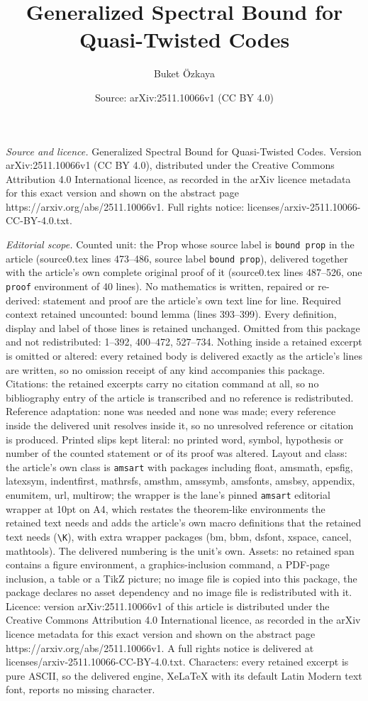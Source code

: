 \documentclass[10pt,a4paper]{amsart}
\title[Generalized Spectral Bound for Quasi-Twisted Codes]{Generalized Spectral Bound for Quasi-Twisted Codes}
\author{Buket \"Ozkaya}
\date{Source: arXiv:2511.10066v1 (CC BY 4.0)}
\begin{document}
\maketitle

\noindent\emph{Source and licence.} Generalized Spectral Bound for Quasi-Twisted Codes. Version arXiv:2511.10066v1 (CC BY 4.0), distributed under the Creative Commons Attribution 4.0 International licence, as recorded in the arXiv licence metadata for this exact version and shown on the abstract page https://arxiv.org/abs/2511.10066v1. Full rights notice: licenses/arxiv-2511.10066-CC-BY-4.0.txt.\par\smallskip

\noindent\textit{Editorial scope.} Counted unit: the Prop whose source label is \texttt{bound prop} in the article (source0.tex lines 473--486, source label \texttt{bound prop}), delivered together with the article's own complete original proof of it (source0.tex lines 487--526, one \texttt{proof} environment of 40 lines). No mathematics is written, repaired or re-derived: statement and proof are the article's own text line for line. Required context retained uncounted: bound lemma (lines 393--399). Every definition, display and label of those lines is retained unchanged. Omitted from this package and not redistributed: 1--392, 400--472, 527--734. Nothing inside a retained excerpt is omitted or altered: every retained body is delivered exactly as the article's lines are written, so no omission receipt of any kind accompanies this package. Citations: the retained excerpts carry no citation command at all, so no bibliography entry of the article is transcribed and no reference is redistributed. Reference adaptation: none was needed and none was made; every reference inside the delivered unit resolves inside it, so no unresolved reference or citation is produced. Printed slips kept literal: no printed word, symbol, hypothesis or number of the counted statement or of its proof was altered. Layout and class: the article's own class is \texttt{amsart} with packages including float, amsmath, epsfig, latexsym, indentfirst, mathrsfs, amsthm, amssymb, amsfonts, amsbsy, appendix, enumitem, url, multirow; the wrapper is the lane's pinned \texttt{amsart} editorial wrapper at 10pt on A4, which restates the theorem-like environments the retained text needs and adds the article's own macro definitions that the retained text needs (\texttt{\textbackslash K}), with extra wrapper packages (bm, bbm, dsfont, xspace, cancel, mathtools). The delivered numbering is the unit's own. Assets: no retained span contains a figure environment, a graphics-inclusion command, a PDF-page inclusion, a table or a TikZ picture; no image file is copied into this package, the package declares no asset dependency and no image file is redistributed with it. Licence: version arXiv:2511.10066v1 of this article is distributed under the Creative Commons Attribution 4.0 International licence, as recorded in the arXiv licence metadata for this exact version and shown on the abstract page https://arxiv.org/abs/2511.10066v1. A full rights notice is delivered at licenses/arxiv-2511.10066-CC-BY-4.0.txt. Characters: every retained excerpt is pure ASCII, so the delivered engine, XeLaTeX with its default Latin Modern text font, reports no missing character.
\end{document}
